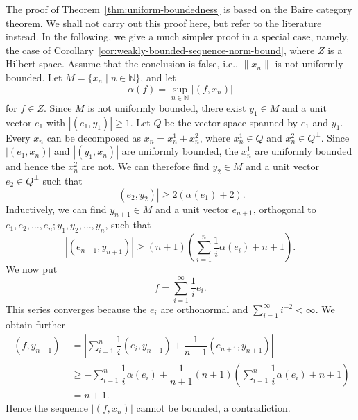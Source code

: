 The proof of Theorem~\ref{thm:uniform-boundedness} is based on the Baire category theorem. We shall not carry out this proof here, but refer to the literature instead. In the following, we give a much simpler proof in a special case, namely, the case of Corollary~\ref{cor:weakly-bounded-sequence-norm-bound}, where $Z$ is a Hilbert space. Assume that the conclusion is false, i.e., $\|x_n\|$ is not uniformly bounded. Let $M=\{x_n\mid n\in\mathbb{N}\}$, and let
\begin{equation}\label{eq:hilbert-unbounded-sequence-functional-supremum}
\alpha(f)=\sup_{n\in\mathbb{N}}|(f,x_n)|
\end{equation}
for $f\in Z$. Since $M$ is not uniformly bounded, there exist $y_1\in M$ and a unit vector $e_1$ with $|(e_1,y_1)|\geq1$. Let $Q$ be the vector space spanned by $e_1$ and $y_1$. Every $x_n$ can be decomposed as $x_n=x_n^1+x_n^2$, where $x_n^1\in Q$ and $x_n^2\in Q^\perp$. Since $|(e_1,x_n)|$ and $|(y_1,x_n)|$ are uniformly bounded, the $x_n^1$ are uniformly bounded and hence the $x_n^2$ are not. We can therefore find $y_2\in M$ and a unit vector $e_2\in Q^\perp$ such that
\begin{equation}\label{eq:hilbert-unbounded-sequence-second-vector}
|(e_2,y_2)|\geq2(\alpha(e_1)+2).
\end{equation}
Inductively, we can find $y_{n+1}\in M$ and a unit vector $e_{n+1}$, orthogonal to $e_1,e_2,\ldots,e_n;y_1,y_2,\ldots,y_n$, such that
\begin{equation}\label{eq:hilbert-unbounded-sequence-inductive-vectors}
|(e_{n+1},y_{n+1})|\geq(n+1)\left(\sum_{i=1}^n\dfrac{1}{i}\alpha(e_i)+n+1\right).
\end{equation}
We now put
\begin{equation}\label{eq:hilbert-unbounded-sequence-testing-series}
f=\sum_{i=1}^{\infty}\dfrac{1}{i}e_i.
\end{equation}
This series converges because the $e_i$ are orthonormal and $\sum_{i=1}^{\infty}i^{-2}<\infty$. We obtain further
\begin{equation}\label{eq:hilbert-unbounded-sequence-contradiction}
\begin{aligned}
|(f,y_{n+1})|&=\left|\sum_{i=1}^n\dfrac{1}{i}(e_i,y_{n+1})+\dfrac{1}{n+1}(e_{n+1},y_{n+1})\right|\\
&\geq-\sum_{i=1}^n\dfrac{1}{i}\alpha(e_i)+\dfrac{1}{n+1}(n+1)\left(\sum_{i=1}^n\dfrac{1}{i}\alpha(e_i)+n+1\right)\\
&=n+1.
\end{aligned}
\end{equation}
Hence the sequence $|(f,x_n)|$ cannot be bounded, a contradiction.
